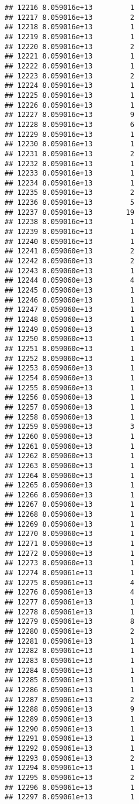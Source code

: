 \documentclass[
]{article}
\begin{document}
\begin{verbatim}
## 12216 8.059016e+13         1
## 12217 8.059016e+13         2
## 12218 8.059016e+13         1
## 12219 8.059016e+13         1
## 12220 8.059016e+13         2
## 12221 8.059016e+13         1
## 12222 8.059016e+13         1
## 12223 8.059016e+13         2
## 12224 8.059016e+13         1
## 12225 8.059016e+13         1
## 12226 8.059016e+13         1
## 12227 8.059016e+13         9
## 12228 8.059016e+13         6
## 12229 8.059016e+13         1
## 12230 8.059016e+13         1
## 12231 8.059016e+13         2
## 12232 8.059016e+13         1
## 12233 8.059016e+13         1
## 12234 8.059016e+13         1
## 12235 8.059016e+13         2
## 12236 8.059016e+13         5
## 12237 8.059016e+13        19
## 12238 8.059016e+13         1
## 12239 8.059016e+13         1
## 12240 8.059016e+13         1
## 12241 8.059060e+13         2
## 12242 8.059060e+13         2
## 12243 8.059060e+13         1
## 12244 8.059060e+13         4
## 12245 8.059060e+13         1
## 12246 8.059060e+13         1
## 12247 8.059060e+13         1
## 12248 8.059060e+13         1
## 12249 8.059060e+13         1
## 12250 8.059060e+13         1
## 12251 8.059060e+13         1
## 12252 8.059060e+13         1
## 12253 8.059060e+13         1
## 12254 8.059060e+13         1
## 12255 8.059060e+13         1
## 12256 8.059060e+13         1
## 12257 8.059060e+13         1
## 12258 8.059060e+13         1
## 12259 8.059060e+13         3
## 12260 8.059060e+13         1
## 12261 8.059060e+13         1
## 12262 8.059060e+13         1
## 12263 8.059060e+13         1
## 12264 8.059060e+13         1
## 12265 8.059060e+13         1
## 12266 8.059060e+13         1
## 12267 8.059060e+13         1
## 12268 8.059060e+13         1
## 12269 8.059060e+13         1
## 12270 8.059060e+13         1
## 12271 8.059060e+13         1
## 12272 8.059060e+13         1
## 12273 8.059060e+13         1
## 12274 8.059061e+13         1
## 12275 8.059061e+13         4
## 12276 8.059061e+13         4
## 12277 8.059061e+13         1
## 12278 8.059061e+13         1
## 12279 8.059061e+13         8
## 12280 8.059061e+13         2
## 12281 8.059061e+13         1
## 12282 8.059061e+13         1
## 12283 8.059061e+13         1
## 12284 8.059061e+13         1
## 12285 8.059061e+13         1
## 12286 8.059061e+13         1
## 12287 8.059061e+13         2
## 12288 8.059061e+13         9
## 12289 8.059061e+13         1
## 12290 8.059061e+13         1
## 12291 8.059061e+13         1
## 12292 8.059061e+13         1
## 12293 8.059061e+13         2
## 12294 8.059061e+13         1
## 12295 8.059061e+13         2
## 12296 8.059061e+13         1
## 12297 8.059061e+13         1

\end{verbatim}
\end{document}
